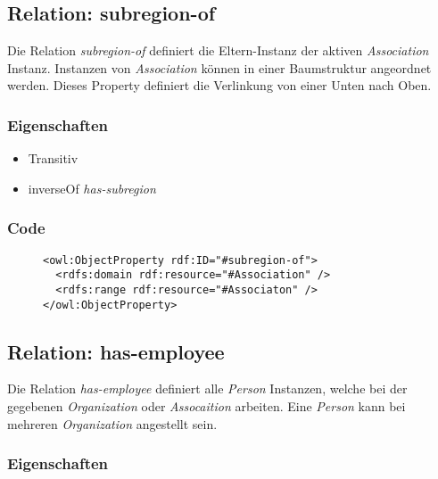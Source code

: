\documentclass[
    11pt,
    latin1,
    a4paper,
    oneside
]{scrreprt}
\begin{document}
\subsection{Relation: subregion-of} \label{sec:rel_subregionof}

Die Relation \emph{subregion-of} definiert die Eltern-Instanz der aktiven \emph{Association} Instanz. Instanzen von \emph{Association} k\"onnen in einer Baumstruktur angeordnet werden. Dieses Property definiert die Verlinkung von einer Unten nach Oben.

\subsubsection{Eigenschaften} \label{sec:rel_subregionof_settings}

\begin{itemize}
  \item Transitiv
  \item inverseOf \emph{has-subregion}
\end{itemize}

\subsubsection{Code} \label{sec:rel_subregionof_code}

\begin{figure}[h]
 \lstset{language=XML}
 \begin{lstlisting}[label=owl:subregionof,caption={Die Relation \emph{subregion-of} definiert die \"ubergeordnete \emph{Association}}]
<owl:ObjectProperty rdf:ID="#subregion-of">
  <rdfs:domain rdf:resource="#Association" />
  <rdfs:range rdf:resource="#Associaton" />
</owl:ObjectProperty>
 \end{lstlisting}
\end{figure}


\subsection{Relation: has-employee} \label{sec:rel_hasemployee}

Die Relation \emph{has-employee} definiert alle \emph{Person} Instanzen, welche bei der gegebenen \emph{Organization} oder \emph{Assocaition} arbeiten. Eine \emph{Person} kann bei mehreren \emph{Organization} angestellt sein.

\subsubsection{Eigenschaften} \label{sec:rel_hasemployee_settings}
\end{document}
